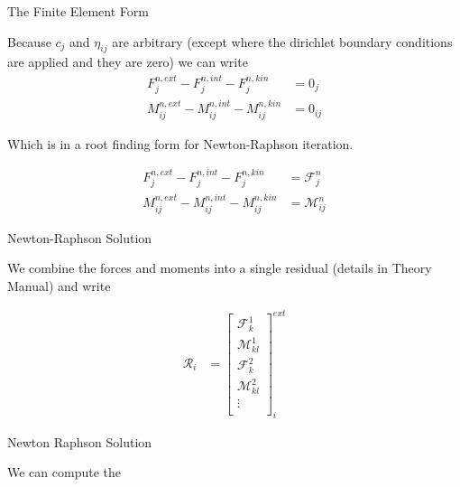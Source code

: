 \documentclass[11pt]{beamer}
\begin{document}
\begin{frame}{The Finite Element Form}

Because $c_j$ and $\eta_{ij}$ are arbitrary (except where the dirichlet boundary conditions are applied and they are zero) we can write
\begin{align*}
F_{j}^{n,ext} - F_{j}^{n,int} - F_{j}^{n,kin} &= 0_j\\
M_{ij}^{n,ext} - M_{ij}^{n,int} - M_{ij}^{n,kin} &= 0_{ij}
\end{align*}

Which is in a root finding form for Newton-Raphson iteration.

\begin{equation}
\begin{aligned}
F_{j}^{n,ext} - F_{j}^{n,int} - F_{j}^{n,kin} &= \mathcal{F}_j^n\\
M_{ij}^{n,ext} - M_{ij}^{n,int} - M_{ij}^{n,kin} &= \mathcal{M}_{ij}^n
\end{aligned}
\label{eqn:residual_form}
\end{equation}


\end{frame}

\begin{frame}{Newton-Raphson Solution}

We combine the forces and moments into a single residual (details in Theory Manual) and write

\begin{equation}
\begin{aligned}
\mathcal{R}_i &= \left[\begin{array}{c}
\mathcal{F}_k^1\\
\mathcal{M}_{kl}^1\\
\mathcal{F}_k^2\\
\mathcal{M}_{kl}^2\\
\vdots\\
\end{array}\right]_i^{ext}
\end{aligned}
\end{equation}

\end{frame}

\begin{frame}{Newton Raphson Solution}

We can compute the 

\end{frame}
\end{document}
